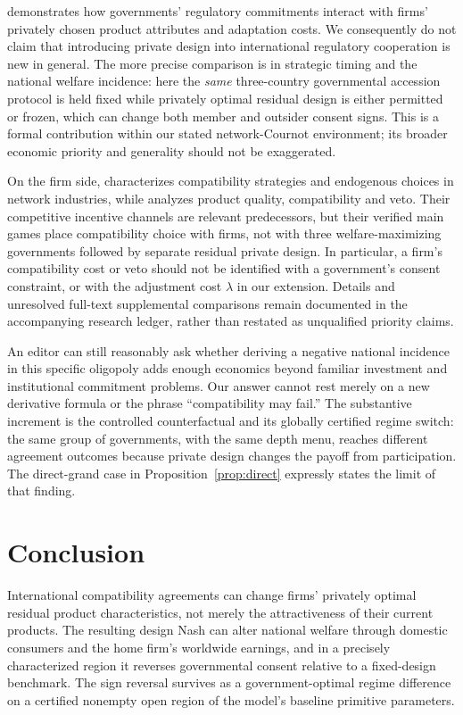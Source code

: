 \documentclass[11pt,a4paper]{article}
\theoremstyle{remark}\newtheorem{remark}[theorem]{Remark}
\begin{document}
\citet{Grossman2021} demonstrates how governments' regulatory commitments interact with firms' privately chosen product attributes and adaptation costs. We consequently do not claim that introducing private design into international regulatory cooperation is new in general. The more precise comparison is in strategic timing and the national welfare incidence: here the \emph{same} three-country governmental accession protocol is held fixed while privately optimal residual design is either permitted or frozen, which can change both member and outsider consent signs. This is a formal contribution within our stated network-Cournot environment; its broader economic priority and generality should not be exaggerated.

On the firm side, \citet{Buccella2023} characterizes compatibility strategies and endogenous choices in network industries, while \citet{Cheng2025} analyzes product quality, compatibility and veto. Their competitive incentive channels are relevant predecessors, but their verified main games place compatibility choice with firms, not with three welfare-maximizing governments followed by separate residual private design. In particular, a firm's compatibility cost or veto should not be identified with a government's consent constraint, or with the adjustment cost $\lambda$ in our extension. Details and unresolved full-text supplemental comparisons remain documented in the accompanying research ledger, rather than restated as unqualified priority claims.

An editor can still reasonably ask whether deriving a negative national incidence in this specific oligopoly adds enough economics beyond familiar investment and institutional commitment problems. Our answer cannot rest merely on a new derivative formula or the phrase ``compatibility may fail.'' The substantive increment is the controlled counterfactual and its globally certified regime switch: the same group of governments, with the same depth menu, reaches different agreement outcomes because private design changes the payoff from participation. The direct-grand case in Proposition~\ref{prop:direct} expressly states the limit of that finding.

\section{Conclusion}
International compatibility agreements can change firms' privately optimal residual product characteristics, not merely the attractiveness of their current products. The resulting design Nash can alter national welfare through domestic consumers and the home firm's worldwide earnings, and in a precisely characterized region it reverses governmental consent relative to a fixed-design benchmark. The sign reversal survives as a government-optimal regime difference on a certified nonempty open region of the model's baseline primitive parameters.
\end{document}

